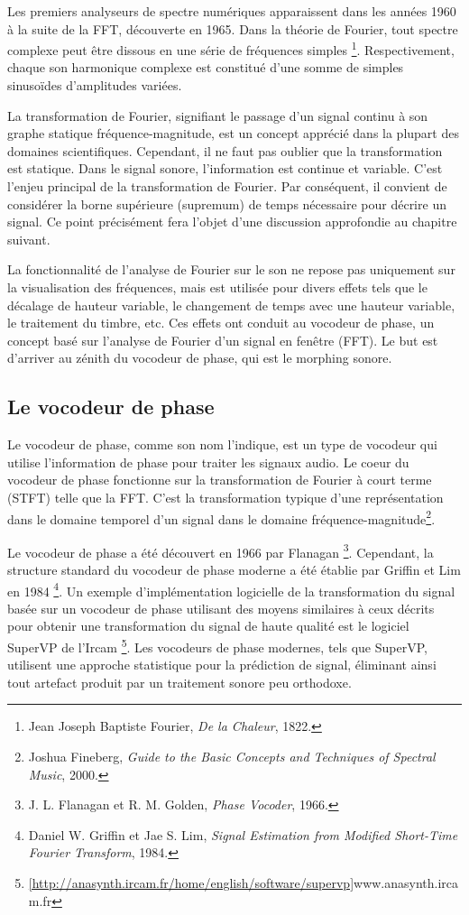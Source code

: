 Les premiers analyseurs de spectre numériques apparaissent dans les années 1960 à la suite de la FFT, découverte en 1965. Dans la théorie de Fourier, tout spectre complexe peut être dissous en une série de fréquences simples \footnote{Jean Joseph Baptiste Fourier, \textit{De la Chaleur}, 1822. \nocite{Herm1895}}. Respectivement, chaque son harmonique complexe est constitué d'une somme de simples sinusoïdes d'amplitudes variées.

La transformation de Fourier, signifiant le passage d'un signal continu à son graphe statique fréquence-magnitude, est un concept apprécié dans la plupart des domaines scientifiques. Cependant, il ne faut pas oublier que la transformation est statique. Dans le signal sonore, l'information est continue et variable. C'est l'enjeu principal de la transformation de Fourier. Par conséquent, il convient de considérer la borne supérieure (supremum) de temps nécessaire pour décrire un signal. Ce point précisément fera l’objet d’une discussion approfondie au chapitre suivant.

La fonctionnalité de l'analyse de Fourier sur le son ne repose pas uniquement sur la visualisation des fréquences, mais est utilisée pour divers effets tels que le décalage de hauteur variable, le changement de temps avec une hauteur variable, le traitement du timbre, etc. Ces effets ont conduit au vocodeur de phase, un concept basé sur l'analyse de Fourier d'un signal en fenêtre (FFT). Le but est d’arriver au zénith du vocodeur de phase, qui est le morphing sonore.

	\subsection{Le vocodeur de phase}

Le vocodeur de phase, comme son nom l'indique, est un type de vocodeur qui utilise l'information de phase pour traiter les signaux audio. Le coeur du vocodeur de phase fonctionne sur la transformation de Fourier à court terme (STFT) telle que la FFT. C'est la transformation typique d'une représentation dans le domaine temporel d'un signal dans le domaine fréquence-magnitude\footnote{Joshua Fineberg, \textit{Guide to the Basic Concepts and Techniques of Spectral Music}, 2000. \nocite{Fin00} }.

Le vocodeur de phase a été découvert en 1966 par Flanagan \footnote{J. L. Flanagan et R. M. Golden, \textit{Phase Vocoder}, 1966. \nocite{flanagan}}. Cependant, la structure standard du vocodeur de phase moderne a été établie par Griffin et Lim en 1984 \footnote{Daniel W. Griffin et Jae S. Lim, \textit{Signal Estimation from Modified Short-Time Fourier Transform}, 1984. \nocite{GrL84}}. Un exemple d'implémentation logicielle de la transformation du signal basée sur un vocodeur de phase utilisant des moyens similaires à ceux décrits pour obtenir une transformation du signal de haute qualité est le logiciel SuperVP de l'Ircam \footnote{ \ref{http://anasynth.ircam.fr/home/english/software/supervp}{www.anasynth.ircam.fr}}. Les vocodeurs de phase modernes, tels que SuperVP, utilisent une approche statistique pour la prédiction de signal, éliminant ainsi tout artefact produit par un traitement sonore peu orthodoxe.


